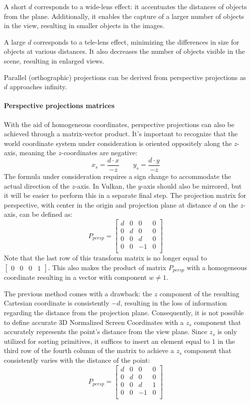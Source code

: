 A short $d$ corresponds to a wide-lens effect: it accentuates the distances of objects from the plane. 
Additionally, it enables the capture of a larger number of objects in the view, resulting in smaller objects in the images.

A large $d$ corresponds to a tele-lens effect, minimizing the differences in size for objects at various distances. 
It also decreases the number of objects visible in the scene, resulting in enlarged views.

Parallel (orthographic) projections can be derived from perspective projections as $d$ approaches infinity.

\paragraph*{Perspective projections matrices}
With the aid of homogeneous coordinates, perspective projections can also be achieved through a matrix-vector product. 
It's important to recognize that the world coordinate system under consideration is oriented oppositely along the $z$-axis, meaning the $z$-coordinates are negative: 
\[x_s=\dfrac{d\cdot x}{-z}\qquad y_s=\dfrac{d\cdot y}{-z}\]
The formula under consideration requires a sign change to accommodate the actual direction of the $z$-axis.
In Vulkan, the $y$-axis should also be mirrored, but it will be easier to perform this in a separate final step.
The projection matrix for perspective, with center in the origin and projection plane at distance $d$ on the $z$-axis, can be defined as:
\[P_{persp}=\begin{bmatrix}
    d & 0 & 0 & 0 \\
    0 & d & 0 & 0 \\
    0 & 0 & d & 0 \\
    0 & 0 & -1 & 0 \\
\end{bmatrix}\]
Note that the last row of this transform matrix is no longer equal to $\begin{bmatrix} 0 & 0 & 0 & 1 \end{bmatrix}$. 
This also makes the product of matrix $P_{persp}$ with a homogeneous coordinate resulting in a vector with component $w \neq 1$.


The previous method comes with a drawback: the $z$ component of the resulting Cartesian coordinate is consistently $-d$, resulting in the loss of information regarding the distance from the projection plane. 
Consequently, it is not possible to define accurate 3D Normalized Screen Coordinates with a $z_s$ component that accurately represents the point's distance from the view plane.
Since $z_s$ is only utilized for sorting primitives, it suffices to insert an element equal to $1$ in the third row of the fourth column of the matrix to achieve a $z_s$ component that consistently varies with the distance of the point: 
\[P_{persp}=\begin{bmatrix}
    d & 0 & 0 & 0 \\
    0 & d & 0 & 0 \\
    0 & 0 & d & 1 \\
    0 & 0 & -1 & 0 \\
\end{bmatrix}\]

